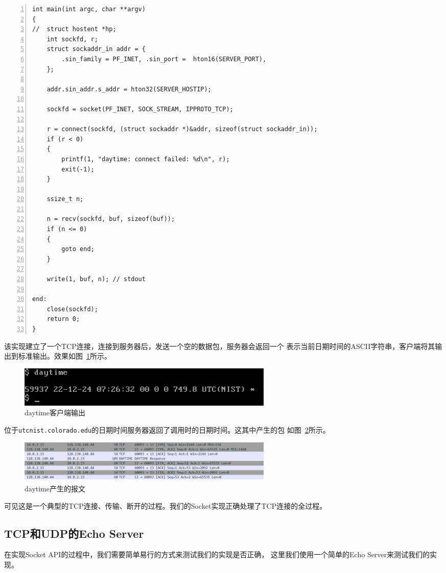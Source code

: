 \documentclass[a4paper,twoside]{ctexrep}
\begin{document}
\begin{spacing}{1.2}
\begin{lstlisting}[numbers=left,style=CppStyle,caption={daytime客户端},label={code:datetime}]
int main(int argc, char **argv)
{
//	struct hostent *hp;
	int sockfd, r;
	struct sockaddr_in addr = {
		.sin_family = PF_INET, .sin_port =  hton16(SERVER_PORT),
	};

	addr.sin_addr.s_addr = hton32(SERVER_HOSTIP);

	sockfd = socket(PF_INET, SOCK_STREAM, IPPROTO_TCP);

	r = connect(sockfd, (struct sockaddr *)&addr, sizeof(struct sockaddr_in));
	if (r < 0)
	{
		printf(1, "daytime: connect failed: %d\n", r);
		exit(-1);
	}

	ssize_t n;

	n = recv(sockfd, buf, sizeof(buf));
	if (n <= 0)
	{
		goto end;
	}

	write(1, buf, n); // stdout

end:
	close(sockfd);
	return 0;
}
\end{lstlisting}

该实现建立了一个TCP连接，连接到服务器后，发送一个空的数据包，服务器会返回一个
表示当前日期时间的ASCII字符串，客户端将其输出到标准输出。效果如图~\ref{fig:daytime}所示。
\begin{figure}[htb]
	\centering
	\caption{daytime客户端输出}
	\label{fig:daytime}
	\includegraphics[width=0.6\textwidth]{daytime.png}
\end{figure}
位于\texttt{utcnist.colorado.edu}的日期时间服务器返回了调用时的日期时间。这其中产生的包
如图~\ref{fig:daytimepacket}所示。
\begin{figure}[htb]
	\centering
	\caption{daytime产生的报文}
	\label{fig:daytimepacket}
	\includegraphics[width=0.6\textwidth]{daytimepack.png}
\end{figure}
可见这是一个典型的TCP连接、传输、断开的过程。我们的Socket实现正确处理了TCP连接的全过程。

\subsection{TCP和UDP的Echo Server}

在实现Socket API的过程中，我们需要简单易行的方式来测试我们的实现是否正确，
这里我们使用一个简单的Echo Server来测试我们的实现。


\end{spacing}
\end{document}

